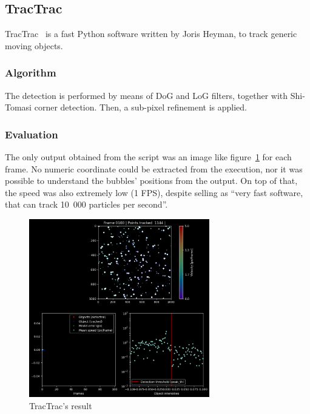 \subsection{TracTrac}
\label{sec:locate:tractrac}

TracTrac~\cite{tractrac} is a fast Python software written by Joris Heyman, to track generic moving objects.

\subsubsection{Algorithm}

The detection is performed by means of DoG and LoG filters, together with Shi-Tomasi corner detection.
Then, a sub-pixel refinement is applied.

\subsubsection{Evaluation}

The only output obtained from the script was an image like figure~\ref{fig:locate:tractrac} for each frame.
No numeric coordinate could be extracted from the execution, nor it was possible to understand the bubbles' positions from the output.
On top of that, the speed was also extremely low (1 FPS), despite selling as ``very fast software, that can track 10~000 particles per second''.

\begin{figure}
	\centerline{\includegraphics[width=0.7\textwidth]{images/locate/tractrac.png}}
	\caption{\centering TracTrac's result}
	\label{fig:locate:tractrac}
\end{figure}

